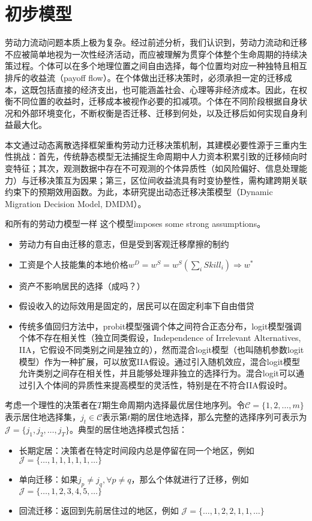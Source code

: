 \documentclass[a4paper,12pt,oneside]{book} %
\begin{document}
\section{初步模型}

劳动力流动问题本质上极为复杂。经过前述分析，我们认识到，劳动力流动和迁移不应被简单地视为一次性经济活动，而应被理解为贯穿个体整个生命周期的持续决策过程。个体可以在多个地理位置之间自由选择，每个位置均对应一种独特且相互排斥的收益流（payoff flow）。在个体做出迁移决策时，必须承担一定的迁移成本，这既包括直接的经济支出，也可能涵盖社会、心理等非经济成本。因此，在权衡不同位置的收益时，迁移成本被视作必要的扣减项。个体在不同阶段根据自身状况和外部环境变化，不断权衡是否迁移、迁移到何处，以及迁移后如何实现自身利益最大化。

本文通过动态离散选择框架重构劳动力迁移决策机制，其建模必要性源于三重内生性挑战：首先，传统静态模型无法捕捉生命周期中人力资本积累引致的迁移倾向时变特征；其次，观测数据中存在不可观测的个体异质性（如风险偏好、信息处理能力）与迁移决策互为因果；第三，区位间收益流具有时变协整性，需构建跨期关联约束下的预期效用函数。为此，本研究提出动态迁移决策模型（Dynamic Migration Decision Model, DMDM）。

和所有的劳动力模型一样 这个模型imposes some strong assumptions。
\begin{itemize}
\item 劳动力有自由迁移的意志，但是受到客观迁移摩擦的制约
\item 工资是个人技能集的本地价格$w^{D}=w^{S}=w^{S}(\sum\limits_{i}Skill_{i})\Rightarrow w^{*}$
\item 资产不影响居民的选择（成吗？）
\item 假设收入的边际效用是固定的，居民可以在固定利率下自由借贷
\item 传统多值回归方法中，probit模型强调个体之间符合正态分布，logit模型强调个体不存在相关性（独立同类假设，Independence of Irrelevant Alternatives, IIA，它假设不同类别之间是独立的），然而混合logit模型（也叫随机参数logit模型）作为一种扩展，可以放宽IIA假设。通过引入随机效应，混合logit模型允许类别之间存在相关性，并且能够处理非独立的选择行为。混合logit可以通过引入个体间的异质性来提高模型的灵活性，特别是在不符合IIA假设时。
\end{itemize}

考虑一个理性的决策者在$T$期生命周期内选择最优居住地序列。令$\mathcal{C} = \{1,2,\dots,m\}$表示居住地选择集，$j_t \in \mathcal{C}$表示第$t$期的居住地选择，那么完整的选择序列可表示为$\mathcal{J}=\{j_1, j_2 ,\dots,j_T\}$。典型的居住地选择模式包括：
\begin{itemize}
  \item 长期定居：决策者在特定时间段内总是停留在同一个地区，例如$\mathcal{J}=\{\dots, 1,1,1,1,1,\dots\}$
  \item 单向迁移：如果$j_p\neq j_q,\forall p \neq q$，那么个体就进行了迁移，例如$\mathcal{J}=\{\dots, 1,2,3,4,5,\dots\}$
  \item 回流迁移：返回到先前居住过的地区，例如 $\mathcal{J}=\{\dots, 1,2,2,1,1,\dots\}$
\end{itemize}
\end{document}

